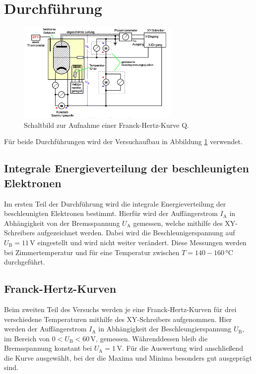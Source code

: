 \section{Durchführung}
\label{sec:Durchführung}
\begin{figure}[H]
    \centering
    \includegraphics[width=0.7\textwidth]{content/Bilder/Aufbau.png}
    \caption{Schaltbild zur Aufnahme einer Franck-Hertz-Kurve Q\cite{anleitungV601}.}
    \label{fig:Aufbau}
\end{figure}
Für beide Durchführungen wird der Versuchaufbau in Abbildung \ref{fig:Aufbau} verwendet.

\subsection{Integrale Energieverteilung der beschleunigten Elektronen}
Im ersten Teil der Durchführung wird die integrale Energieverteilung der beschleunigten Elektronen bestimmt. 
Hierfür wird der Auffängerstrom $I_{\text{A}}$ in Abhängigkeit von der Bremsspannung $U_{\text{A}}$ gemessen, welche 
mithilfe des XY-Schreibers aufgezeichnet werden. 
Dabei wird die Beschleunigerspannung auf $U_{\text{B}} = 11\,\unit{\volt}$ eingestellt und wird nicht weiter verändert. 
Diese Messungen werden bei Zimmertemperatur und für eine Temperatur zwischen $T = 140-160\,\unit{\celsius}$ durchgeführt.

\subsection{Franck-Hertz-Kurven}
Beim zweiten Teil des Versuchs werden je eine Franck-Hertz-Kurven für drei verschiedene Temperaturen mithilfe des XY-Schreibers aufgenommen. 
Hier werden der Auffängerstrom $I_{\text{A}}$ in Abhängigkeit der Beschleungierspannung $U_{\text{B}}$, im Bereich von 
$0 < U_{\text{B}} < 60\,\unit{\volt}$, gemessen. Währenddessen bleib die Bremsspannung konstant bei $U_{\text{A}}= 1\,\unit{\volt}$.
Für die Auswertung wird anschließend die Kurve ausgewählt, bei der die Maxima und Minima besonders gut ausgeprägt sind. 